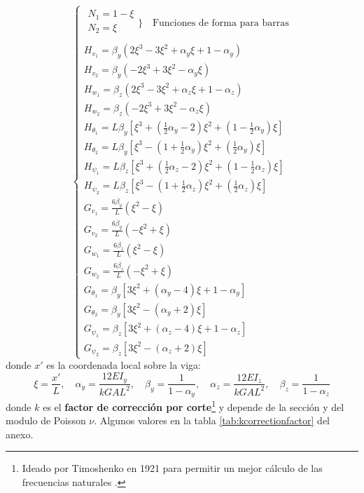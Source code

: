 \documentclass[11pt, a4paper,titlepage]{article}
\begin{document}
\[
\begin{cases}
\!\!\!\!\!
\begin{array}{l}
N_{1}=1-\xi \\
N_2 = \xi \\
\end{array}\Bigg\}\quad  \text{Funciones de forma para barras}\\
H_{v_{1}}=\beta_{y}\left(2 \xi^{3}-3 \xi^{2}+\alpha_{y} \xi+1-\alpha_{y}\right)\\
H_{v_{2}}=\beta_{y}\left(-2 \xi^{3}+3 \xi^{2}-\alpha_{y} \xi\right) \\
H_{w_{1}}=\beta_{z}\left(2 \xi^{3}-3 \xi^{2}+\alpha_{z} \xi+1-\alpha_{z}\right) \\
H_{w_{2}}=\beta_{z}\left(-2 \xi^{3}+3 \xi^{2}-\alpha_{z} \xi\right)\\
H_{\theta_{1}}=L \beta_{y}\left[\xi^{3}+\left(\frac{1}{2} \alpha_{y}-2\right) \xi^{2}+\left(1-\frac{1}{2} \alpha_{y}\right) \xi\right] \\
H_{\theta_{2}}=L \beta_{y}\left[\xi^{3}-\left(1+\frac{1}{2} \alpha_{y}\right) \xi^{2}+\left(\frac{1}{2} \alpha_{y}\right) \xi\right] \\
H_{\psi_{1}}=L \beta_{z}\left[\xi^{3}+\left(\frac{1}{2} \alpha_{z}-2\right) \xi^{2}+\left(1-\frac{1}{2} \alpha_{z}\right) \xi\right] \\
H_{\psi_{2}}=L \beta_{z}\left[\xi^{3}-\left(1+\frac{1}{2} \alpha_{z}\right) \xi^{2}+\left(\frac{1}{2} \alpha_{z}\right) \xi\right] \\
G_{v_{1}}=\frac{6 \beta_{y}}{L}\left(\xi^{2}-\xi\right) \\
G_{v_{2}}=\frac{6 \beta_{y}}{L}\left(-\xi^{2}+\xi\right) \\
G_{w_{1}}=\frac{6 \beta_{z}}{L}\left(\xi^{2}-\xi\right) \\
G_{w_{2}}=\frac{6 \beta_{z}}{L}\left(-\xi^{2}+\xi\right) \\
G_{\theta_{1}}=\beta_{y}\left[3 \xi^{2}+\left(\alpha_{y}-4\right) \xi+1-\alpha_{y}\right] \\
G_{\theta_{2}}=\beta_{y}\left[3 \xi^{2}-\left(\alpha_{y}+2\right) \xi\right] \\
G_{\psi_{1}}=\beta_{z}\left[3 \xi^{2}+\left(\alpha_{z}-4\right) \xi+1-\alpha_{z}\right] \\
G_{\psi_{2}}=\beta_{z}\left[3 \xi^{2}-\left(\alpha_{z}+2\right) \xi\right]
\end{cases}
\]
donde $x'$ es la coordenada local sobre la viga:
\[
\xi=\frac{x'}{L}, \quad \alpha_{y}=\frac{12 E I_{y}}{k G A L^{2}}, \quad \beta_{y}=\frac{1}{1-\alpha_{y}}, \quad \alpha_{z}=\frac{12 E I_{z}}{k G A L^{2}},\quad  \beta_{z}=\frac{1}{1-\alpha_{z}}
\]
donde $k$ es el \textbf{factor de corrección por corte}\footnote{Ideado por Timoshenko en 1921 para permitir un mejor cálculo de las frecuencias naturales \cite{dong2010much}.} y depende de la sección y del modulo de Poisson $\nu$. Algunos valores en la tabla \ref{tab:kcorrectionfactor} del anexo.
\end{document}
